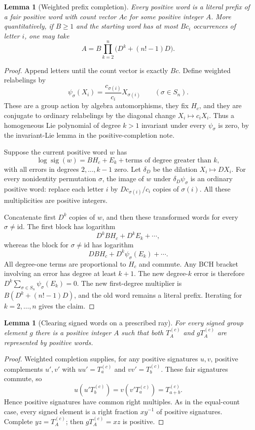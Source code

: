 \documentclass[11pt]{article}
\newtheorem{lemma}[theorem]{Lemma}
\begin{document}
\begin{lemma}[Weighted prefix completion]\label{completion}
Every positive word is a literal prefix of a fair positive word with
count vector $Ac$ for some positive integer $A$. More quantitatively,
if $B\ge1$ and the starting word has at most $Bc_i$ occurrences of
letter $i$, one may take
\[
 A=B\prod_{k=2}^n\bigl(D^k+(n!-1)D\bigr).
\]
\end{lemma}
\begin{proof}
Append letters until the count vector is exactly $Bc$. Define weighted
relabelings by
\[
 \psi_\sigma(X_i)=\frac{c_{\sigma(i)}}{c_i}X_{\sigma(i)}
 \qquad(\sigma\in S_n).
\]
These are a group action by algebra automorphisms, they fix $H_c$, and
they are conjugate to ordinary relabelings by the diagonal change
$X_i\mapsto c_iX_i$. Thus a homogeneous Lie polynomial of degree
$k>1$ invariant under every $\psi_\sigma$ is zero, by the invariant-Lie
lemma in the positive-completion note.

Suppose the current positive word $w$ has
\[
 \log\operatorname{sig}(w)=BH_c+E_k+\text{terms of degree greater than }k,
\]
with all errors in degrees $2,\ldots,k-1$ zero.
Let $\delta_D$ be the dilation $X_i\mapsto DX_i$.
For every nonidentity permutation $\sigma$, the image of $w$ under
$\delta_D\psi_\sigma$ is an ordinary positive word: replace each
letter $i$ by $D c_{\sigma(i)}/c_i$ copies of $\sigma(i)$.
All these multiplicities are positive integers.

Concatenate first $D^k$ copies of $w$, and then these transformed
words for every $\sigma\ne\mathrm{id}$. The first block has logarithm
\[
 D^k BH_c+D^k E_k+\cdots,
\]
whereas the block for $\sigma\ne\mathrm{id}$ has logarithm
\[
 DBH_c+D^k\psi_\sigma(E_k)+\cdots.
\]
All degree-one terms are proportional to $H_c$ and commute.
Any BCH bracket involving an error has degree at least $k+1$.
The new degree-$k$ error is therefore
$D^k\sum_{\sigma\in S_n}\psi_\sigma(E_k)=0$.
The new first-degree multiplier is
$B(D^k+(n!-1)D)$, and the old word remains a literal prefix.
Iterating for $k=2,\ldots,n$ gives the claim.
\end{proof}

\begin{lemma}[Clearing signed words on a prescribed ray]\label{clearing}
For every signed group element $g$ there is a positive integer $A$
such that both $T_A^{(c)}$ and $gT_A^{(c)}$ are represented by positive
words.
\end{lemma}
\begin{proof}
Weighted completion supplies, for any positive signatures $u,v$,
positive complements $u',v'$ with $uu'=T_a^{(c)}$ and
$vv'=T_b^{(c)}$. These fair signatures commute, so
\[
 u(u'T_b^{(c)})=v(v'T_a^{(c)})=T_{a+b}^{(c)}.
\]
Hence positive signatures have common right multiples. As in the
equal-count case, every signed element is a right fraction $xy^{-1}$
of positive signatures. Complete $yz=T_A^{(c)}$; then
$gT_A^{(c)}=xz$ is positive.
\end{proof}
\end{document}
